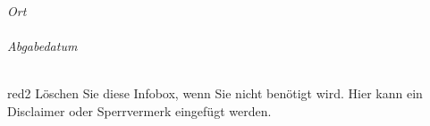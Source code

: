 \begin{titlepage}
\begin{center}
\vfill

{\large
\emph{Ort}\\
\tloc\\
\vspace{0.2cm}
\emph{Abgabedatum}\\
\tdate\\
\vspace{0.5cm}
}

\vfill
\begin{textbox}{red}{2}
    Löschen Sie diese Infobox, wenn Sie nicht benötigt wird. Hier kann ein Disclaimer oder Sperrvermerk eingefügt werden.
\end{textbox}

\vfill
\end{center}
\end{titlepage}
\restoregeometry